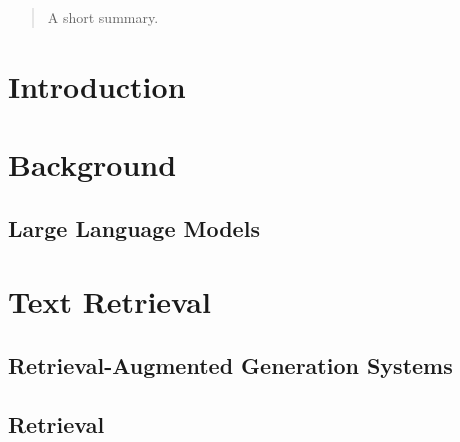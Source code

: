 \documentclass[english,master]{swsLeipzig}
\begin{document}
\begin{frontmatter}
  \begin{abstract}
    A short summary.
  \end{abstract}

  \tableofcontents





\end{frontmatter}

\chapter{Introduction}\label{introduction}


\chapter{Background}\label{background}

\section{Large Language Models}\label{llm}


\chapter{Text Retrieval}\label{retrieval}


\section{Retrieval-Augmented Generation Systems}\label{rag}


\section{Retrieval}\label{retrieval}

\end{document}
